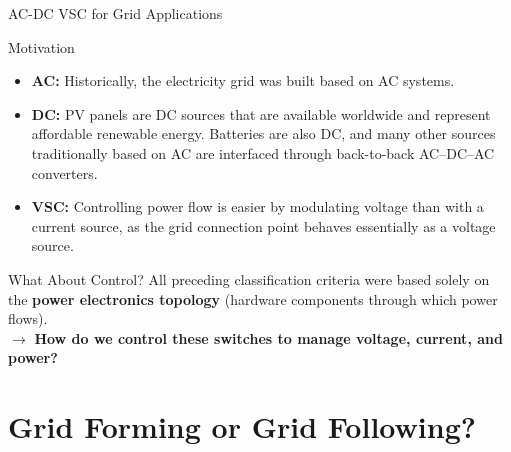 \begin{frame}{AC-DC VSC for Grid Applications}
  \begin{block}{Motivation}
    \begin{itemize}\small
      \item \textbf{AC:} Historically, the electricity grid was built based on AC systems.
      \item \textbf{DC:} PV panels are DC sources that are available worldwide and represent affordable renewable energy. Batteries are also DC, and many other sources traditionally based on AC are interfaced through back-to-back AC--DC--AC converters.
      \item \textbf{VSC:} Controlling power flow is easier by modulating voltage than with a current source, as the grid connection point behaves essentially as a voltage source.
    \end{itemize}
  \end{block}

  \begin{block}{What About Control?}
    \small
    All preceding classification criteria were based solely on the \textbf{power electronics topology} (hardware components through which power flows).\\
    $\rightarrow$ \textbf{How do we control these switches to manage voltage, current, and power?}
  \end{block}
\end{frame}

\section{Grid Forming or Grid Following?}

